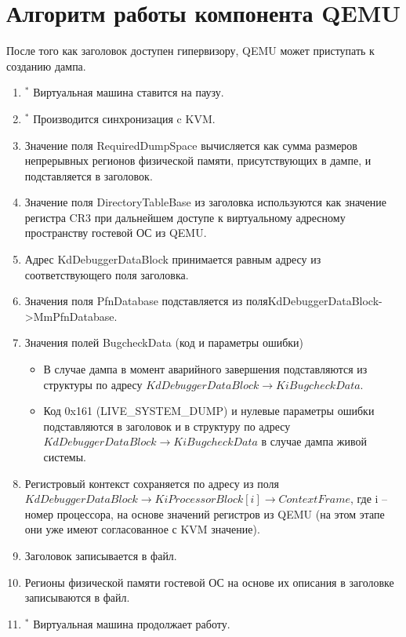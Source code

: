 \documentclass{mipt-thesis-bs}
\begin{document}
\section*{Алгоритм работы компонента QEMU}

После того как заголовок доступен гипервизору, QEMU может приступать к созданию дампа.

\begin{enumerate}
    \item $\!\!\!\!{^*}$ Виртуальная машина ставится на паузу.
    \item $\!\!\!\!{^*}$ Производится синхронизация c KVM.
    \item Значение поля RequiredDumpSpace вычисляется как сумма размеров непрерывных регионов физической памяти, присутствующих в дампе, и подставляется в заголовок.
    \item Значение поля DirectoryTableBase из заголовка используются как значение регистра CR3 при дальнейшем доступе к виртуальному адресному пространству гостевой ОС из QEMU.
    \item Адрес KdDebuggerDataBlock принимается равным адресу из соответствующего поля заголовка.
    \item Значения поля PfnDatabase подставляется из поля\newline KdDebuggerDataBlock->MmPfnDatabase.
    \item Значения полей BugcheckData (код и параметры ошибки)
    \begin{itemize}
        \item В случае дампа в момент аварийного завершения подставляются из структуры по адресу $KdDebuggerDataBlock \! \rightarrow \! KiBugcheckData$.
        \item Код 0x161 (LIVE{\_}SYSTEM{\_DUMP}) и нулевые параметры ошибки подставляются в заголовок и в структуру по адресу $KdDebuggerDataBlock \! \rightarrow \! KiBugcheckData$ в случае дампа живой системы.
    \end{itemize}
    \item Регистровый контекст сохраняется по адресу из поля $KdDebuggerDataBlock \! \rightarrow \! KiProcessorBlock[i] \! \rightarrow \! ContextFrame$, где i -- номер процессора, на основе значений регистров из QEMU (на этом этапе они уже имеют согласованное с KVM значение).
    \item Заголовок записывается в файл.
    \item Регионы физической памяти гостевой ОС на основе их описания в заголовке записываются в файл.
    \item $\!\!\!\!{^*}$ Виртуальная машина продолжает работу.
\end{enumerate}
\end{document}

